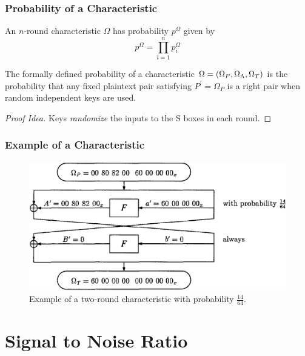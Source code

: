 \documentclass{beamer}
\begin{document}
	\begin{frame}
		\frametitle{Probability of a Characteristic}
		\begin{definition}
			An \(n\)-round characteristic \(\Omega\) has probability
			\(p^\Omega\) given by
			\begin{equation}
				p^\Omega = \prod_{i=1}^n p_i^\Omega
				\label{eq:prob-char}
			\end{equation}
		\end{definition}
		\pause
		\begin{theorem}
			The formally defined probability of a characteristic \(\Omega =
			(\Omega_P, \Omega_\Lambda, \Omega_T)\) is the probability that
			any fixed plaintext pair satisfying \(P^\prime = \Omega_P\) is a
			right pair when random independent keys are used.
		\end{theorem}
		\pause
		\begin{proof}[Proof Idea]
			Keys \emph{randomize} the inputs to the S boxes in each round.
		\end{proof}
	\end{frame}

	\begin{frame}
		\frametitle{Example of a Characteristic}
		\begin{figure}[!ht]
			\centering
			\includegraphics[width=0.9\linewidth]{images/des_char.png}
			\caption{Example of a two-round characteristic with probability \(\frac{14}{64}\).}
			\label{fig:des-char-example}
		\end{figure}
	\end{frame}

	\section{Signal to Noise Ratio}
	
\end{document}
